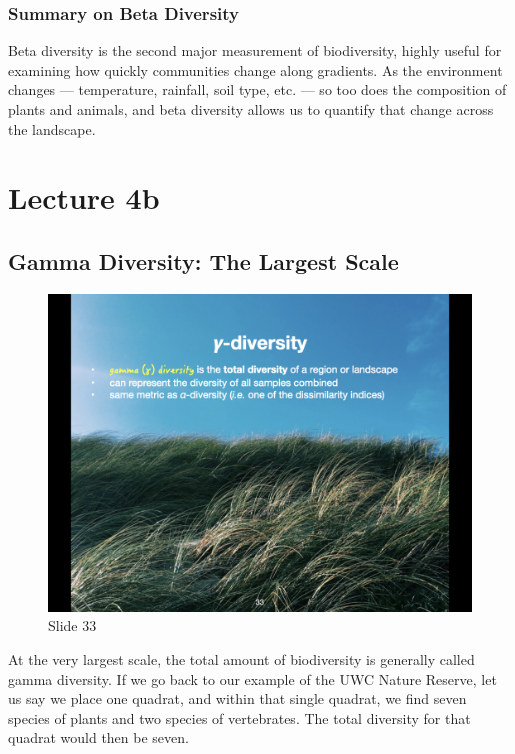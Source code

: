 \documentclass[
  12pt,
]{book}
\begin{document}
\subsection{Summary on Beta Diversity}\label{summary-on-beta-diversity}

Beta diversity is the second major measurement of biodiversity, highly
useful for examining how quickly communities change along gradients. As
the environment changes --- temperature, rainfall, soil type, etc. ---
so too does the composition of plants and animals, and beta diversity
allows us to quantify that change across the landscape.

\chapter*{Lecture 4b}\label{lecture-4b}

\section{Gamma Diversity: The Largest
Scale}\label{gamma-diversity-the-largest-scale}

\begin{figure}[ht]
\centering
\includegraphics[width=0.8\linewidth]{../images/BDC334/BDC334-033.jpeg}
\caption*{Slide 33}
\end{figure}

At the very largest scale, the total amount of biodiversity is generally
called gamma diversity. If we go back to our example of the UWC Nature
Reserve, let us say we place one quadrat, and within that single
quadrat, we find seven species of plants and two species of vertebrates.
The total diversity for that quadrat would then be seven.
\end{document}
